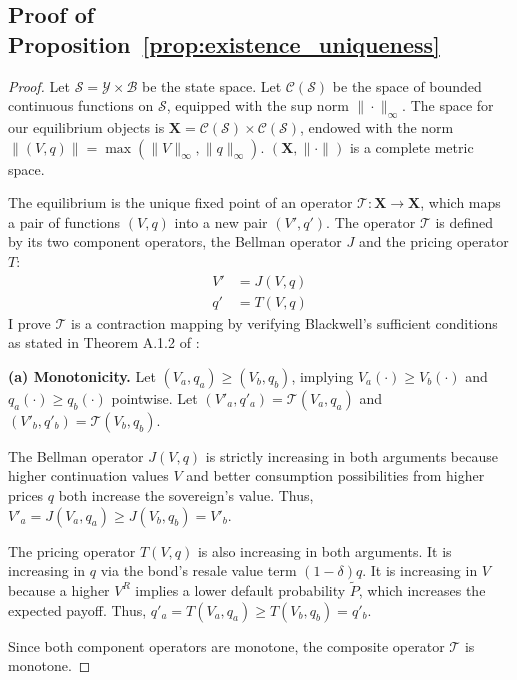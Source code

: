\documentclass[12pt]{article}
\theoremstyle{plain}
\begin{document}
\subsection{Proof of Proposition~\ref{prop:existence_uniqueness}}\label{app:proof_existence_uniqueness}

\begin{proof}
	Let $\mathcal{S} = \mathcal{Y} \times \mathcal{B}$ be the state space. Let $\mathcal{C}(\mathcal{S})$ be the space of bounded continuous functions on $\mathcal{S}$, equipped with the sup norm $\|\cdot\|_\infty$. The space for our equilibrium objects is $\mathbf{X} = \mathcal{C}(\mathcal{S}) \times \mathcal{C}(\mathcal{S})$, endowed with the norm $\|(V, q)\| = \max(\|V\|_\infty, \|q\|_\infty)$. $(\mathbf{X}, \|\cdot\|)$ is a complete metric space.

	The equilibrium is the unique fixed point of an operator $\mathcal{T}:
		\mathbf{X} \to \mathbf{X}$, which maps a pair of functions $(V, q)$ into a new
	pair $(V', q')$. The operator $\mathcal{T}$ is defined by its two component
	operators, the Bellman operator $J$ and the pricing operator $T$:
	\begin{align*}
		V' & = J(V, q) \\
		q' & = T(V, q)
	\end{align*}
	I prove $\mathcal{T}$ is a contraction mapping by verifying Blackwell's sufficient conditions as stated in Theorem A.1.2 of \citep{LjungqvistSargent2000}:

	\textbf{(a) Monotonicity.} Let $(V_a, q_a) \ge (V_b, q_b)$, implying $V_a(\cdot) \ge V_b(\cdot)$ and $q_a(\cdot) \ge q_b(\cdot)$ pointwise.
	Let $(V'_a, q'_a) = \mathcal{T}(V_a, q_a)$ and $(V'_b, q'_b) = \mathcal{T}(V_b, q_b)$.

	The Bellman operator $J(V, q)$ is strictly increasing in both arguments because
	higher continuation values $V$ and better consumption possibilities from higher
	prices $q$ both increase the sovereign's value. Thus, $V'_a = J(V_a, q_a) \ge
		J(V_b, q_b) = V'_b$.

	The pricing operator $T(V, q)$ is also increasing in both arguments. It is
	increasing in $q$ via the bond's resale value term $(1-\delta)q$. It is
	increasing in $V$ because a higher $V^R$ implies a lower default probability
	$\tilde{P}$, which increases the expected payoff. Thus, $q'_a = T(V_a, q_a) \ge
		T(V_b, q_b) = q'_b$.

	Since both component operators are monotone, the composite operator
	$\mathcal{T}$ is monotone.


\end{proof}
\end{document}
